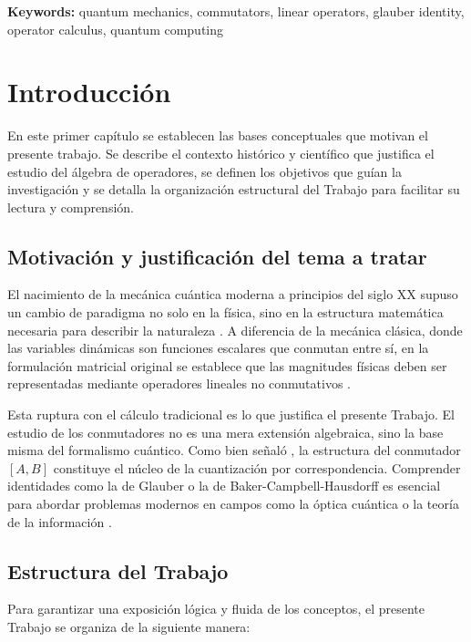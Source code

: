 \documentclass[11pt,a4paper,spanish]{book}
\begin{document}
\vspace{0.5cm}
{\bf Keywords:} quantum mechanics, commutators, linear operators, glauber identity, operator calculus, quantum computing

\mainmatter


\chapter{Introducción}

En este primer capítulo se establecen las bases conceptuales que motivan el presente trabajo. Se describe el contexto histórico y científico que justifica el estudio del álgebra de operadores, se definen los objetivos que guían la investigación y se detalla la organización estructural del Trabajo para facilitar su lectura y comprensión.

\section{Motivación y justificación del tema a tratar}

El nacimiento de la mecánica cuántica moderna a principios del siglo XX supuso un cambio de paradigma no solo en la física, sino en la estructura matemática necesaria para describir la naturaleza \citep{kuhn1962}. A diferencia de la mecánica clásica, donde las variables dinámicas son funciones escalares que conmutan entre sí, en la formulación matricial original se establece que las magnitudes físicas deben ser representadas mediante operadores lineales no conmutativos \citep{heisenberg1925}.

Esta ruptura con el cálculo tradicional es lo que justifica el presente Trabajo. El estudio de los conmutadores no es una mera extensión algebraica, sino la base misma del formalismo cuántico. Como bien señaló \cite{dirac1925}, la estructura del conmutador $[A, B]$ constituye el núcleo de la cuantización por correspondencia. Comprender identidades como la de Glauber o la de Baker-Campbell-Hausdorff es esencial para abordar problemas modernos en campos como la óptica cuántica o la teoría de la información \citep{nielsen2010}.

\section{Estructura del Trabajo}

Para garantizar una exposición lógica y fluida de los conceptos, el presente Trabajo se organiza de la siguiente manera:
\end{document}
